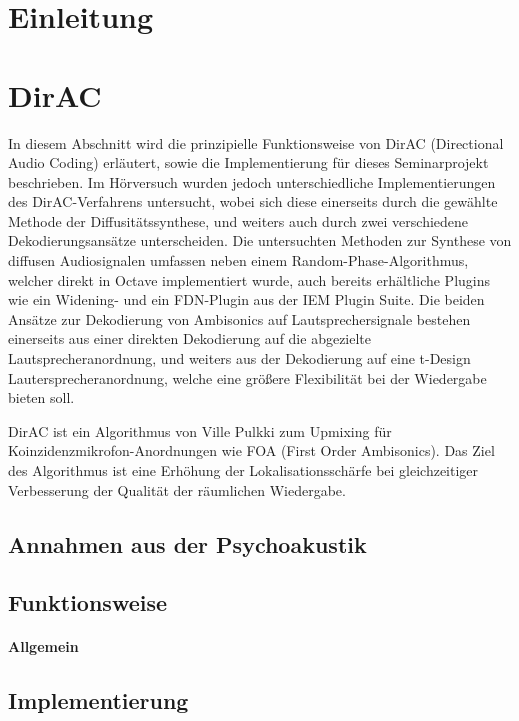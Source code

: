 \documentclass[12pt, a4paper]{article}
\begin{document}
\tableofcontents
\newpage

\section{Einleitung}

\section{DirAC}
In diesem Abschnitt wird die prinzipielle Funktionsweise von DirAC (Directional Audio Coding) erläutert, sowie die Implementierung für dieses Seminarprojekt beschrieben. Im Hörversuch wurden jedoch unterschiedliche Implementierungen des DirAC-Verfahrens untersucht, wobei sich diese einerseits durch die gewählte Methode der Diffusitätssynthese, und weiters auch durch zwei verschiedene Dekodierungsansätze unterscheiden. Die untersuchten Methoden zur Synthese von diffusen Audiosignalen umfassen neben einem Random-Phase-Algorithmus, welcher direkt in Octave implementiert wurde, auch bereits erhältliche Plugins wie ein Widening- und ein FDN-Plugin aus der IEM Plugin Suite. Die beiden Ansätze zur Dekodierung von Ambisonics auf Lautsprechersignale bestehen einerseits aus einer direkten Dekodierung auf die abgezielte Lautsprecheranordnung, und weiters aus der Dekodierung auf eine t-Design Lautersprecheranordnung, welche eine größere Flexibilität bei der Wiedergabe bieten soll.

DirAC ist ein Algorithmus von Ville Pulkki \cite{pulkki} zum Upmixing für Koinzidenzmikrofon-Anordnungen wie FOA (First Order Ambisonics). Das Ziel des Algorithmus ist eine Erhöhung der Lokalisationsschärfe bei gleichzeitiger Verbesserung der Qualität der räumlichen Wiedergabe.

\newpage

    \subsection{Annahmen aus der Psychoakustik} \label{annahmen}
    
    \subsection{Funktionsweise}
    
        \paragraph{Allgemein}
        
    \subsection{Implementierung}
    
\end{document}
